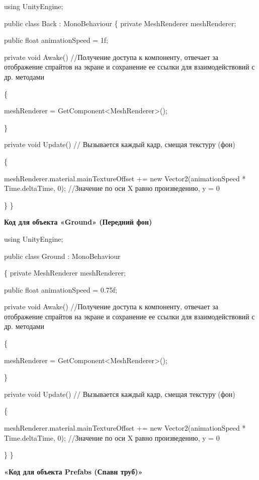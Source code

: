 \documentclass[14pt, oneside]{altsu-report}
\begin{document}
using UnityEngine;

public class Back : MonoBehaviour
\{
    private MeshRenderer meshRenderer;
    
    public float animationSpeed = 1f;

    private void Awake() //Получение доступа к компоненту, отвечает за отображение спрайтов на экране и сохранение ее ссылки для взаимодействовий с др. методами

    \{
    
        meshRenderer = GetComponent<MeshRenderer>();
        
    \}

    private void Update() // Вызывается каждый кадр, смещая текстуру (фон) 

    \{
    
        meshRenderer.material.mainTextureOffset += new Vector2(animationSpeed * Time.deltaTime, 0); //Значение по оси X равно произведению, y =  0
        
    \}
\}

\begin{center}
\label{code:appendix}\textbf{Код для объекта «Ground» (Передний фон)} 
\end{center}

using UnityEngine;

public class Ground : MonoBehaviour

\{
    private MeshRenderer meshRenderer;
    
    public float animationSpeed = 0.75f;

    private void Awake() //Получение доступа к компоненту, отвечает за отображение спрайтов на экране и сохранение ее ссылки для взаимодействовий с др. методами

    \{
    
        meshRenderer = GetComponent<MeshRenderer>();
        
    \}

    private void Update() // Вызывается каждый кадр, смещая текстуру (фон) 

    \{
        
        meshRenderer.material.mainTextureOffset += new Vector2(animationSpeed * Time.deltaTime, 0); //Значение по оси X равно произведению, y =  0
        
    \}
\}

\begin{center}
\label{code:appendix}\textbf{«Код для объекта Prefabs (Спавн труб)»} 
\end{center}
\end{document}
